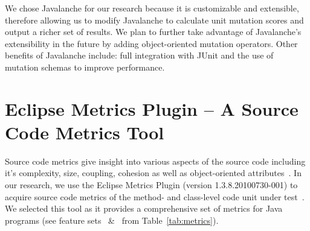 We chose Javalanche for our research because it is customizable and extensible, therefore allowing us to modify Javalanche to calculate unit mutation scores and output a richer set of results. We plan to further take advantage of Javalanche's extensibility in the future by adding object-oriented mutation operators. Other benefits of Javalanche include: full integration with JUnit and the use of mutation schemas to improve performance.

\section{Eclipse Metrics Plugin -- A Source Code Metrics Tool}
\label{sec:Metrics}
Source code metrics give insight into various aspects of the source code including it's complexity, size, coupling, cohesion as well as object-oriented attributes~\cite{SCE05,McCa76,Kan02,HWY09,Hend95,SRD12}. In our research, we use the Eclipse Metrics Plugin (version 1.3.8.20100730-001) to acquire source code metrics of the method- and class-level code unit under test~\cite{Metrics}. We selected this tool as it provides a comprehensive set of metrics for Java programs (see feature sets ~\&~ from Table~\ref{tab:metrics}).

